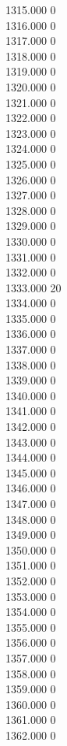 { 1315.000	0 \\
 1316.000	0 \\
 1317.000	0 \\
 1318.000	0 \\
 1319.000	0 \\
 1320.000	0 \\
 1321.000	0 \\
 1322.000	0 \\
 1323.000	0 \\
 1324.000	0 \\
 1325.000	0 \\
 1326.000	0 \\
 1327.000	0 \\
 1328.000	0 \\
 1329.000	0 \\
 1330.000	0 \\
 1331.000	0 \\
 1332.000	0 \\
 1333.000	20 \\
 1334.000	0 \\
 1335.000	0 \\
 1336.000	0 \\
 1337.000	0 \\
 1338.000	0 \\
 1339.000	0 \\
 1340.000	0 \\
 1341.000	0 \\
 1342.000	0 \\
 1343.000	0 \\
 1344.000	0 \\
 1345.000	0 \\
 1346.000	0 \\
 1347.000	0 \\
 1348.000	0 \\
 1349.000	0 \\
 1350.000	0 \\
 1351.000	0 \\
 1352.000	0 \\
 1353.000	0 \\
 1354.000	0 \\
 1355.000	0 \\
 1356.000	0 \\
 1357.000	0 \\
 1358.000	0 \\
 1359.000	0 \\
 1360.000	0 \\
 1361.000	0 \\
 1362.000	0 \\
}
